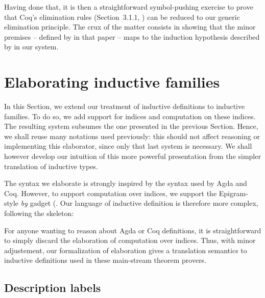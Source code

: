 \documentclass{scrartcl}
\theoremstyle{plain}
\theoremstyle{definition}
\begin{document}
Having done that, it is then a straightforward symbol-pushing exercise
to prove that Coq's elimination rules (Section~3.1.1,
\citep{gimenez:coq-induction}) can be reduced to our generic
elimination principle. The crux of the matter consists in showing that
the minor premises -- defined by  in that paper --
maps to the induction hypothesis described by
 in our system.







\section{Elaborating inductive families}
\label{sec:elab-data-family}



In this Section, we extend our treatment of inductive definitions to
inductive families. To do so, we add support for indices and
computation on these indices. The resulting system subsumes the one
presented in the previous Section. Hence, we shall reuse many
notations used previously: this should not affect reasoning or
implementing this elaborator, since only that last system is
necessary. We shall however develop our intuition of this more
powerful presentation from the simpler translation of inductive types.



The syntax we elaborate is strongly inspired by the syntax used by
Agda and Coq. However, to support computation over indices, we support
the Epigram-style \emph{by} gadget (. Our language of
inductive definition is therefore more complex, following the
skeleton:



For anyone wanting to reason about Agda or Coq definitions, it is
straightforward to simply discard the elaboration of computation over
indices. Thus, with minor adjustement, our formalization of
elaboration gives a translation semantics to inductive definitions
used in these main-stream theorem provers.



\subsection{Description labels}

\newcommand{\idatatel}[1]{\mathrm{idatatel}_{#1}}
\newcommand{\TypeIDataTel}[2]{\Judgment{#1}{#2 \:\idatatel{}}}
\newcommand{\InterpretIDataTel}[1]{\green{\llbracket} #1 \green{\rrbracket_D}}
\end{document}
